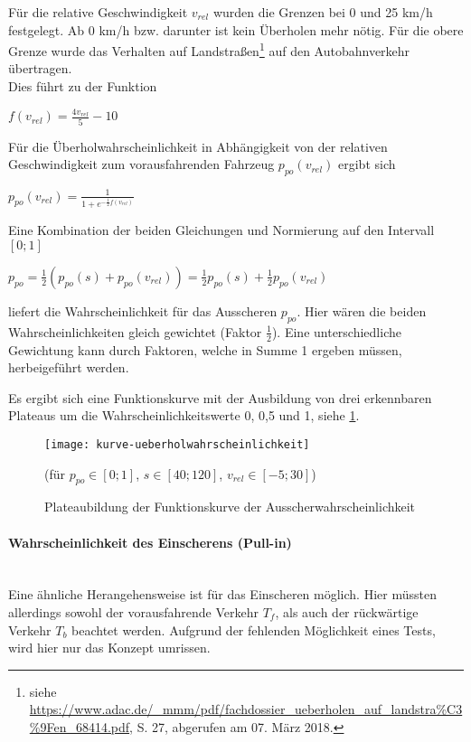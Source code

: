 \noindent
Für die relative Geschwindigkeit $ v_{rel} $ wurden die Grenzen bei 0 und 25 km/h festgelegt.
Ab 0 km/h bzw. darunter ist kein Überholen mehr nötig.
Für die obere Grenze wurde das Verhalten auf Landstraßen\footnote{siehe \url{https://www.adac.de/_mmm/pdf/fachdossier_ueberholen_auf_landstra\%C3\%9Fen_68414.pdf}, S. 27, abgerufen am 07. März 2018.}
auf den Autobahnverkehr übertragen.
\\
Dies führt zu der Funktion 
\begin{center}
$ f(v_{rel}) = \frac{4 v_{rel}}{5} - 10 $
\end{center}
Für die Überholwahrscheinlichkeit in Abhängigkeit von der relativen Geschwindigkeit zum vorausfahrenden Fahrzeug $ p_{po}(v_{rel}) $ ergibt sich
\begin{center}
$ p_{po}(v_{rel}) = \frac{1}{1 + e^{-\frac{1}{2}f(v_{rel})}} $
\end{center}

\noindent
Eine Kombination der beiden Gleichungen und Normierung auf den Intervall $ [0; 1] $
\begin{center}
$ p_{po} = \frac{1}{2}(p_{po}(s) + p_{po}(v_{rel})) = \frac{1}{2}p_{po}(s) + \frac{1}{2}p_{po}(v_{rel}) $
\end{center}
liefert die Wahrscheinlichkeit für das Ausscheren $ p_{po} $.
Hier wären die beiden Wahrscheinlichkeiten gleich gewichtet (Faktor $ \frac{1}{2} $). Eine unterschiedliche Gewichtung kann durch Faktoren, welche in Summe 1 ergeben müssen, herbeigeführt werden.

Es ergibt sich eine Funktionskurve mit der Ausbildung von drei erkennbaren Plateaus um die Wahrscheinlichkeitswerte 0, 0,5 und 1, siehe \cref{figure:kurve-ueberholwahrscheinlichkeit}.

\begin{figure}[hptb]
 \centering
 \texttt{[image: kurve-ueberholwahrscheinlichkeit]}
 \caption[Funktionskurve für die Ausscherwahrscheinlichkeit]
 		 {Plateaubildung der Funktionskurve der Ausscherwahrscheinlichkeit}
 		 {\footnotesize(für $ p_{po} \in [0; 1] $, $ s \in [ 40; 120 ] $, $ v_{rel} \in [ -5; 30 ] $)}
 \label{figure:kurve-ueberholwahrscheinlichkeit}
\end{figure} 


\paragraph*{Wahrscheinlichkeit des Einscherens (Pull-in)} 
\hfill \\
Eine ähnliche Herangehensweise ist für das Einscheren möglich.
Hier müssten allerdings sowohl der vorausfahrende Verkehr $ T_{f} $, als auch der rückwärtige Verkehr $ T_{b} $ beachtet werden. 
Aufgrund der fehlenden Möglichkeit eines Tests, wird hier nur das Konzept umrissen.

